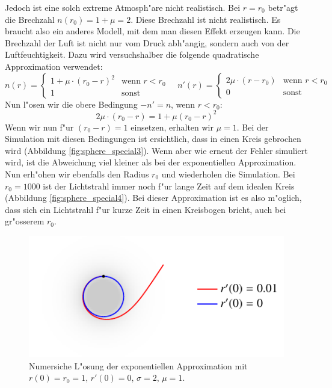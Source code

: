 \begin{refsection}
Jedoch ist eine solch extreme Atmosph"are nicht realistisch. 
Bei $r = r_0$ betr"agt die Brechzahl $n(r_0) = 1 + \mu = 2$. 
Diese Brechzahl ist nicht realistisch. 
Es braucht also ein anderes Modell, mit dem man diesen Effekt erzeugen kann.
Die Brechzahl der Luft ist nicht nur vom Druck abh"angig, sondern auch von der Luftfeuchtigkeit. 
Dazu wird versuchshalber die folgende quadratische Approximation verwendet:
$$n(r) = \left\{ \begin{array}{ll} 1 + \mu \cdot (r_0 - r)^2 & \text{wenn } r < r_0 \\ 1 & \text{sonst} \end{array} \right. \quad n'(r) = \left\{ \begin{array}{ll} 2\mu \cdot (r - r_0) & \text{wenn } r < r_0 \\ 0 & \text{sonst} \end{array} \right.$$
Nun l"osen wir die obere Bedingung $-n' = n $, wenn $r < r_0$:
$$2\mu \cdot (r_0 - r) = 1 + \mu(r_0 - r)^2$$
Wenn wir nun f"ur $(r_0 - r) = 1$ einsetzen, erhalten wir $\mu = 1$. 
Bei der Simulation mit diesen Bedingungen ist ersichtlich, dass in einen Kreis gebrochen wird (Abbildung \ref{fig:sphere_special3}). 
Wenn aber wie erneut der Fehler simuliert wird, ist die Abweichung viel kleiner als bei der exponentiellen Approximation. 
Nun erh"ohen wir ebenfalls den Radius $r_0$ und wiederholen die Simulation. 
Bei $r_0 = 1000$ ist der Lichtstrahl immer noch f"ur lange Zeit auf dem idealen Kreis (Abbildung \ref{fig:sphere_special4}). 
Bei dieser Approximation ist es also m"oglich, dass sich ein Lichtstrahl f"ur kurze Zeit in einen Kreisbogen bricht, auch bei gr"osserem $r_0$.
\begin{figure}
  \centering
  \includegraphics[scale=1]{licht/standalone/fig_kreis_exp1.pdf} 
  \caption{Numersiche L"osung der exponentiellen Approximation mit $r(0) = r_0 = 1$, $r'(0) = 0$, $\sigma = 2$, $\mu = 1$. \label{fig:sphere_special1}}

\end{figure}


\end{refsection}
